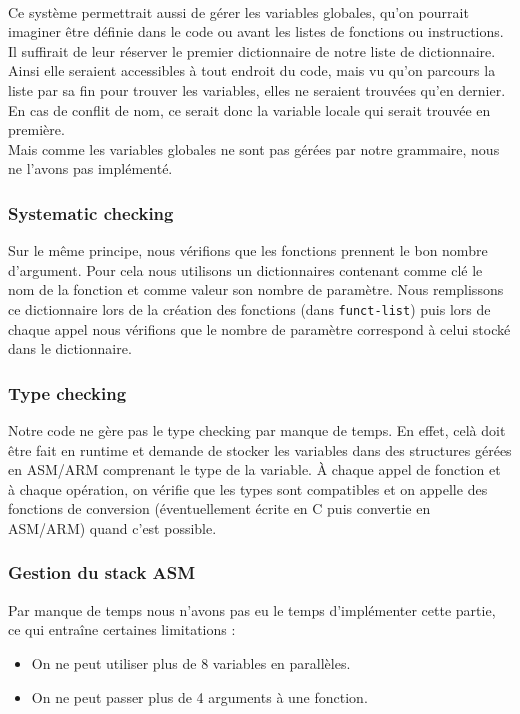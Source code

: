 \documentclass[a4paper,10pt]{article}
\begin{document}
		~\\
		Ce système permettrait aussi de gérer les variables globales, qu'on pourrait imaginer être définie dans le code ou avant les listes de fonctions ou instructions. Il suffirait de leur réserver le premier dictionnaire de notre liste de dictionnaire. Ainsi elle seraient accessibles à tout endroit du code, mais vu qu'on parcours la liste par sa fin pour trouver les variables, elles ne seraient trouvées qu'en dernier. En cas de conflit de nom, ce serait donc la variable locale qui serait trouvée en première.\\
		Mais comme les variables globales ne sont pas gérées par notre grammaire, nous ne l'avons pas implémenté.

	\subsubsection{Systematic checking}
		Sur le même principe, nous vérifions que les fonctions prennent le bon nombre d'argument. Pour cela nous utilisons un dictionnaires contenant comme clé le nom de la fonction et comme valeur son nombre de paramètre. Nous remplissons ce dictionnaire lors de la création des fonctions (dans \verb?funct-list?) puis lors de chaque appel nous vérifions que le nombre de paramètre correspond à celui stocké dans le dictionnaire.

	\subsubsection{Type checking}
		Notre code ne gère pas le type checking par manque de temps. En effet, celà doit être fait en runtime et demande de stocker les variables dans des structures gérées en ASM/ARM comprenant le type de la variable. À chaque appel de fonction et à chaque opération, on vérifie que les types sont compatibles et on appelle des fonctions de conversion (éventuellement écrite en C puis convertie en ASM/ARM) quand c'est possible.

	\subsubsection{Gestion du stack ASM}
		\label{sct:gestionStack}
		Par manque de temps nous n'avons pas eu le temps d'implémenter cette partie, ce qui entraîne certaines limitations : \begin{itemize}
			\item On ne peut utiliser plus de 8 variables en parallèles.
			\item On ne peut passer plus de 4 arguments à une fonction.
		\end{itemize}
\end{document}
